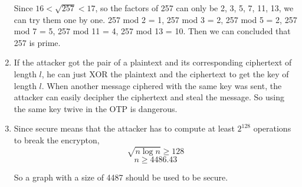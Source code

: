 \documentclass{article}
\begin{document}
\begin{enumerate}
Since $16<\sqrt{257}<17$, so the factors of 257 can only be 2, 3, 5, 7, 11, 13, we can try them one by one. 257 mod 2 = 1, 257 mod 3 = 2, 257 mod 5 = 2, 257 mod 7 = 5, 257 mod 11 = 4, 257 mod 13 = 10. Then we can concluded that 257 is prime.

\item
If the attacker got the pair of a plaintext and its corresponding ciphertext of length $l$, he can just XOR the plaintext and the ciphertext to get the key of length $l$. When another message ciphered with the same key was sent, the attacker can easily decipher the ciphertext and steal the message. So using the same key twive in the OTP is dangerous.

\item
Since secure means that the attacker has to compute at least $2^{128}$ operations to break the encrypton, $$\sqrt{n\log n}\geqslant 128$$
$$n\geqslant4486.43$$

So  a graph with a size of 4487 should be used to be secure.

\end{enumerate}
\end{document}
